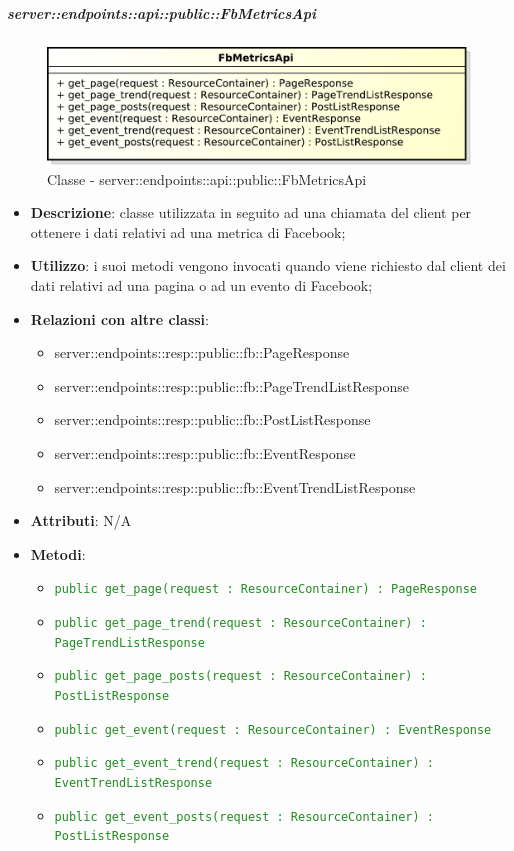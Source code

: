     \subparagraph{server::endpoints::api::public::FbMetricsApi} %
    \label{subp:bdsm_app_server_endpoints_api_public_fbmetricsapi}
	\begin{figure}[!htbp]
		\centering
		\centerline{\includegraphics[scale=0.6]{./images/server/classes/endpoints/fb_metrics_api.pdf}}
		\caption{Classe - server::endpoints::api::public::FbMetricsApi}
	\end{figure}
    \begin{itemize}
      \item \textbf{Descrizione}: classe utilizzata in seguito ad una chiamata del client per ottenere i dati relativi ad una metrica di Facebook;
      \item \textbf{Utilizzo}: i suoi metodi vengono invocati quando viene richiesto dal client dei dati relativi ad una pagina o ad un evento di Facebook;
      \item \textbf{Relazioni con altre classi}:
        \begin{itemize}
          \item server::endpoints::resp::public::fb::PageResponse
          \item server::endpoints::resp::public::fb::PageTrendListResponse
          \item server::endpoints::resp::public::fb::PostListResponse
          \item server::endpoints::resp::public::fb::EventResponse
          \item server::endpoints::resp::public::fb::EventTrendListResponse
        \end{itemize}
		\item \textbf{Attributi}: N/A
		\item \textbf{Metodi}:
			\begin{itemize}
				\item \textcolor{forestgreen}{\texttt{public get\_page(request : ResourceContainer) : PageResponse}}
				\item \textcolor{forestgreen}{\texttt{public get\_page\_trend(request : ResourceContainer) : PageTrendListResponse}}
				\item \textcolor{forestgreen}{\texttt{public get\_page\_posts(request : ResourceContainer) : PostListResponse}}
				\item \textcolor{forestgreen}{\texttt{public get\_event(request : ResourceContainer) : EventResponse}}
				\item \textcolor{forestgreen}{\texttt{public get\_event\_trend(request : ResourceContainer) : EventTrendListResponse}}
				\item \textcolor{forestgreen}{\texttt{public get\_event\_posts(request : ResourceContainer) : PostListResponse}}
			\end{itemize}
      \end{itemize}

